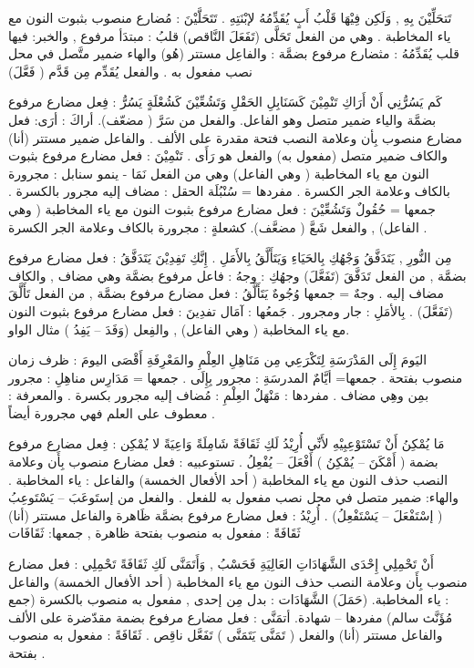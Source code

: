 \documentclass[a4paper]{article}
\begin{document}
\begin{flushright}
تَتحَلِّيْنَ بِهِ , وَلَكِن فِيْهَا قَلْبُ أَبٍ يُقَدِّمُهُ لإبْنَتِهِ .
تَتَحَلَّيْنَ : مُضارع منصوب بثبوت النون مع ياء المخاطبة .
            وهي من الفعل تَحَلَّى (تَفَعَلَ النَّاقص)
قلبُ : مبتدَأ مرفوع , والخبر: فيها قلب
يُقَدِّمُهُ : مثضارع مرفوع بضمَّة : والفاعِل مستتر (هُو) والهاء
      ضمير متَّصل في محل نصب مفعول به . والفعل يُقَدِّم
      مِن قَدَّم ( فَعَّلَ)


كَم يَسُرُّنِي أَنْ أَرَاكِ تَنْمِيْنَ كَسَنَابِلِ الحَقْلِ وَتَشُعِّيْنَ كَشُعْلَةٍ
يَسُرُّ : فِعل مضارع مرفوع بضمَّة والياء ضمير متصل وهو الفاعل.
      والفعل من سَرَّ ( مضعّف).
أراكَ : أرَى: فعل مضارع منصوب بِأن وعلامة النصب فتحة مقدرة على
الألف . والفاعل ضمير مستتر (أنا) والكاف ضمير متصل (مفعول به) والفعل هو رَأَى .
تَنْمِيْنَ : فعل مضارع مرفوع بثبوت النون مع ياء المخاطبة ( وهي الفاعل)
      وهي من الفعل نَمَا - ينمو
سنابل : مجرورة بالكاف وعلامة الجر الكسرة . مفردها = سُنْبُلَة
الحقل : مضاف إليه مجرور بالكسرة . جمعها = حُقُولٌ
وَتَشُعِّيْنَ : فعل مضارع مرفوع بثبوت النون مع ياء المخاطبة ( وهي الفاعل) , والفعل شَعَّ ( مضعَّف).
كشعلةٍ : مجرورة بالكاف وعلامة الجر الكسرة .

مِن النُّورِ , يَتَدَفَّقُ وَجْهُكِ بِالحَيَاءِ وَيَتَأَلَّقُ بِالأَمَلِ . إِنَّكِ تَفِدِيْنَ
يَتَدَفَّقُ : فعل مضارع مرفوع بضمَّة , من الفعل تَدَفَّقَ (تَفَعَّلَ)
وجهُكِ : وجهُ : فاعل مرفوع بضمَّة وهي مضاف , والكاف مضاف إليه .
            وجهٌ = جمعها وُجُوهٌ
يَتَأَلَّقُ : فعل مضارع مرفوع بضمَّة , من الفعل تَأَلَّقَ (تَفَعَّلَ) .
بِالأمَلِ : جار ومجرور .  جَمعُها : آمَال
تفدِينَ : فعل مضارع مرفوع بثبوت النون مع ياء المخاطبة ( وهي الفاعل) , والفِعل (وَفَدَ – يَفِدُ ) مثال الواو.

اليَومَ إِلَى المَدْرَسَةِ لِتَكْرَعِي مِن مَنَاهِلِ العِلْمِ والمَعْرِفَةِ أَقْصَى
اليومَ : ظرف زمان منصوب بفتحة . جمعها= أيَّامٌ
المدرسَةِ : مجرور بِإِلَى . جمعها = مَدَارِس
مناهِلِ : مجرور بمِن وهِي مضاف . مفردها : مَنْهَلٌ
العِلْمِ : مُضاف إليه مجرور بكسرة .
والمعرفة : معطوف على العلم فهي مجرورة أيضاً .

مَا يُمْكِنُ أَنْ تَسْتَوْعِبِيْهِ لأَنِّي أُرِيْدُ لَكِ ثَقَافَةً شَامِلَةً وَاعِيَةً لا
يُمْكِن : فِعل مضارع مرفوع بضمة ( أَمْكَنَ – يُمْكِنُ ) أَفْعَلَ – يُفْعِلُ .
تستوعبيه : فعل مضارع منصوب بِأَن وعلامة النصب حذف النون مع ياء
      المخاطبة ( أحد الأفعال الخمسة) والفاعل : ياء المخاطبة . والهاء:
      ضمير متصل في محل نصب مفعول به للفعل . والفعل من
      إستَوعَبَ – يَسْتَوعِبُ ( إسْتَفْعَلَ – يَسْتَفْعِلُ) .
أُرِيْدُ : فعل مضارع مرفوع بضمَّة ظَاهرة والفاعل مستتر (أنا)
ثَقَافَةً : مفعول به منصوب بفتحة ظاهرة , جمعها: ثَقَافَات

أَنْ تَحْمِلِي إِحْدَى الشَّهَادَاتِ العَالِيَةِ فَحَسْبُ , وَأَتَمَنَّى لَكِ ثَقَافَةً
تَحْمِلِي : فعل مضارع منصوب بِأَن وعلامة النصب حذف النون مع ياء
      المخاطبة ( أحد الأفعال الخمسة) والفاعل : ياء المخاطبة. (حَمَلَ)
الشَّهَادَات : بدل مِن إحدى , مفعول به منصوب بالكسرة (جمع مُؤَنَّث سالم)
           مفردها – شهادة.
أتمَنَّى : فعل مضارع مرفوع بضمة مقدّضرة على الألف والفاعل مستتر
      (أنا) والفعل ( تَمَنَّى يَتَمَنَّى ) تَفَعَّل ناقِص .
ثَقَافَةً : مفعول به منصوب بفتحة .


\end{flushright}
\end{document}
